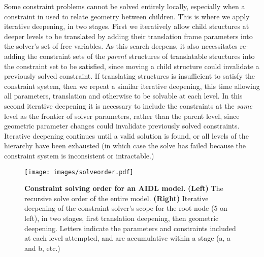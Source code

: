 Some constraint problems cannot be solved entirely locally, especially when a constraint in used to relate geometry between children. This is where we apply iterative deepening, in two stages. First we iteratively allow child structures at deeper levels to be translated by adding their translation frame parameters into the solver's set of free variables. As this search deepens, it also necessitates re-adding the constraint sets of the \emph{parent} structures of translatable structures into the constraint set to be satisfied, since moving a child structure could invalidate a previously solved constraint. If translating structures is insufficient to satisfy the constraint system, then we repeat a similar iterative deepening, this time allowing all parameters, translation and otherwise to be solvable at each level. In this second iterative deepening it is necessary to include the constraints at the \emph{same} level as the frontier of solver parameters, rather than the parent level, since geometric parameter changes could invalidate previously solved constraints. Iterative deepening continues until a valid solution is found, or all levels of the hierarchy have been exhausted (in which case the solve has failed because the constraint system is inconsistent or intractable.)

\begin{figure}
    \centering
    \texttt{[image: images/solveorder.pdf]}
    \caption{\textbf{Constraint solving order for an AIDL model.} \textbf{(Left)} The recursive solve order of the entire model. \textbf{(Right)} Iterative deepening of the constraint solver's scope for the root node (5 on left), in two stages, first translation deepening, then geometric deepening. Letters indicate the parameters and constraints included at each level attempted, and are accumulative within a stage (a, a and b, etc.)}
    \label{fig:solveorder}
\end{figure}

